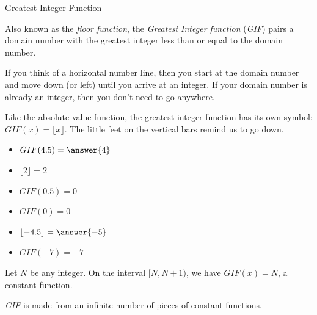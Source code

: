 \documentclass{ximera}
\begin{document}
\begin{example} Greatest Integer Function 

Also known as the \textit{floor function}, the \textit{Greatest Integer function} (\textit{GIF}) pairs a domain number with the greatest integer less than or equal to the domain number.

If you think of a horizontal number line, then you start at the domain number and move down (or left) until you arrive at an integer.  If your domain number is already an integer, then you don't need to go anywhere.


Like the absolute value function, the greatest integer function has its own symbol:  $GIF(x) = \lfloor x \rfloor$. The little feet on the vertical bars remind us to go down.

\begin{itemize}
\item $GIF(4.5) = \answer{4}$
\item $\lfloor 2 \rfloor = 2$
\item $GIF(0.5) = 0$
\item $GIF(0) = 0$
\item $\lfloor -4.5 \rfloor = \answer{-5}$
\item $GIF(-7) = -7$
\end{itemize}




Let $N$ be any integer. On the interval $[N, N+1)$, we have $GIF(x) = N$, a constant function.

\textit{GIF} is made from an infinite number of pieces of constant functions.







\end{example}
\end{document}
